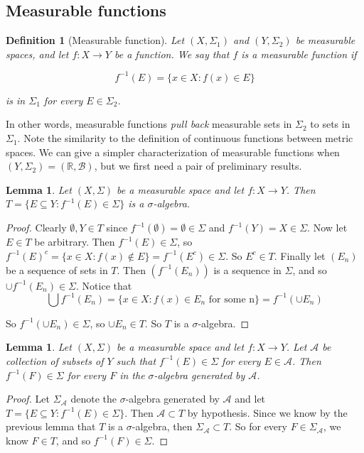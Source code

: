\documentclass{amsart}
\newcommand{\bbR}{\mathbb{R}}
\newcommand{\Borel}{\mathcal{B}}
\newtheorem{lemma}[theorem]{Lemma}
\newtheorem{definition}[theorem]{Definition}
\begin{document}
\bigskip

\subsection{Measurable functions}


\begin{definition}[Measurable function]\label{def:measurable-fn}
    Let $(X, \Sigma_1)$ and $(Y, \Sigma_2)$ be measurable spaces, and let $f:X
    \rightarrow Y$ be a function. We say that $f$ is a measurable function if 

    $$ f^{-1}(E) = \{x \in X : f(x) \in E \}  $$

    is in $\Sigma_1$ for every $E \in \Sigma_2$.
\end{definition}

In other words, measurable functions \textit{pull back} measurable sets in
$\Sigma_2$ to sets in $\Sigma_1$. Note the similarity to the definition of
continuous functions between metric spaces. We can give a simpler characterization of
measurable functions when $(Y, \Sigma_2) = (\bbR, \Borel)$, but we first need a
pair of preliminary results.

\begin{lemma}
    Let $(X, \Sigma)$ be a measurable space and let $f : X \rightarrow Y$. Then
    $T = \{E \subseteq Y :  f^{-1}(E) \in \Sigma \}$ is a $\sigma$-algebra.
\end{lemma}
\begin{proof}
Clearly $\emptyset, Y \in T$ since $f^{-1}(\emptyset) = \emptyset \in \Sigma$
and $f^{-1}(Y)  = X \in \Sigma$. Now let $E \in T$ be arbitrary. Then $f^{-1}(E)
\in \Sigma$, so $f^{-1}(E)^c = \{x \in X : f(x) \notin E \} = f^{-1}(E^c) \in
\Sigma$. So $E^c \in T$. Finally  let $(E_n)$ be a sequence of sets in $T$. Then
$(f^{-1}(E_n))$ is a sequence in $\Sigma$, and so $\cup f^{-1}(E_n) \in \Sigma$.
Notice that
$$\bigcup f^{-1}(E_n) = \{x \in X : f(x) \in E_n \textrm{   for some n} \} =
f^{-1}(\cup E_n)$$

So $f^{-1}(\cup E_n) \in \Sigma$, so $\cup E_n \in T$. So $T$ is a $\sigma$-algebra.

\end{proof}

\begin{lemma}\label{lemma:fn-preimage-generated}
   Let $(X, \Sigma)$ be a measurable space and let $f : X \rightarrow Y$. Let
   $\mathcal{A}$ be collection of subsets of $Y$ such that $f^{-1}(E) \in
   \Sigma$ for every $E \in \mathcal{A}$. Then $f^{-1}(F) \in \Sigma$ for every
   $F$ in the $\sigma$-algebra generated by $\mathcal{A}$.
\end{lemma}
\begin{proof}
    Let $\Sigma_{\mathcal{A}}$ denote the $\sigma$-algebra generated by
    $\mathcal{A}$ and let $T = \{E \subseteq Y :  f^{-1}(E) \in \Sigma \}$. Then
    $\mathcal{A} \subset T$ by hypothesis. Since we know by the previous lemma
    that $T$ is a $\sigma$-algebra, then $\Sigma_{\mathcal{A}} \subset T$. So
    for every $F \in \Sigma_{\mathcal{A}}$, we know $F \in T$, and so
    $f^{-1}(F) \in \Sigma$. 
\end{proof}
\end{document}
